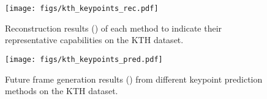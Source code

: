 \documentclass[letterpaper, 10 pt, conference]{ieeeconf}
\begin{document}
\begin{figure}[t]
	\texttt{[image: figs/kth\_keypoints\_rec.pdf]}
	\centering
	\caption{Reconstruction results () of each method to indicate their representative capabilities on the KTH dataset. 
	}
	\label{fig:kth_keypoints_rec}
	\vspace{-1mm}
\end{figure} 

\begin{table}[t]
	\centering
	\caption{Frame reconstruction results of different detection methods on the KTH dataset.}
	\label{tab:ablation}
	\vspace{-4mm}
\end{table}




\begin{figure}[t]
	\texttt{[image: figs/kth\_keypoints\_pred.pdf]}
	\centering
	\caption{Future frame generation results () from different keypoint prediction methods on the KTH dataset. 
	}
	\label{fig:kth_keypoints_pred}
	\vspace{-1mm}
\end{figure}
\end{document}
